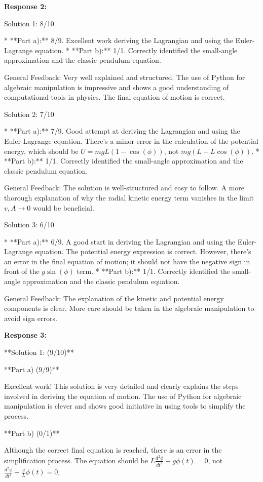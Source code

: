 \documentclass[a4paper,11pt]{article}
\begin{document}
\bigskip    
\textbf{Response 2:}

Solution 1: 8/10

*   **Part a):** 8/9. Excellent work deriving the Lagrangian and using the Euler-Lagrange equation.
*   **Part b):** 1/1. Correctly identified the small-angle approximation and the classic pendulum equation.

General Feedback: Very well explained and structured. The use of Python for algebraic manipulation is impressive and shows a good understanding of computational tools in physics. The final equation of motion is correct.

Solution 2: 7/10

*   **Part a):** 7/9. Good attempt at deriving the Lagrangian and using the Euler-Lagrange equation. There's a minor error in the calculation of the potential energy, which should be \( U = m g L (1 - \cos(\phi)) \), not \( m g (L - L \cos(\phi)) \).
*   **Part b):** 1/1. Correctly identified the small-angle approximation and the classic pendulum equation.

General Feedback:  The solution is well-structured and easy to follow. A more thorough explanation of why the radial kinetic energy term vanishes in the limit \( v, A \rightarrow 0 \) would be beneficial.

Solution 3: 6/10

*   **Part a):** 6/9. A good start in deriving the Lagrangian and using the Euler-Lagrange equation. The potential energy expression is correct. However, there's an error in the final equation of motion; it should not have the negative sign in front of the \( g \sin(\phi) \) term.
*   **Part b):** 1/1. Correctly identified the small-angle approximation and the classic pendulum equation.

General Feedback:  The explanation of the kinetic and potential energy components is clear. More care should be taken in the algebraic manipulation to avoid sign errors.

\bigskip    
\textbf{Response 3:}

**Solution 1: (9/10)**

**Part a) (9/9)**

Excellent work! This solution is very detailed and clearly explains the steps involved in deriving the equation of motion. The use of Python for algebraic manipulation is clever and shows good initiative in using tools to simplify the process.

**Part b) (0/1)**

Although the correct final equation is reached, there is an error in the simplification process. The equation should be $ L\frac{d^2\phi}{dt^2} + g\phi(t) = 0 $, not $ \frac{d^2\phi}{dt^2} + \frac{g}{L}\phi(t) = 0 $.
\end{document}
